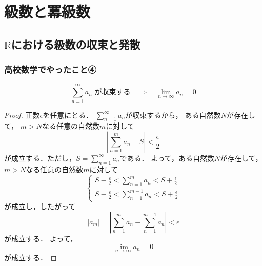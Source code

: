 \documentclass[./index]{subfiles}
\begin{document}
\section{級数と冪級数}

\subsection{$\mathbb{R}$における級数の収束と発散}
\subsubsection{高校数学でやったこと④}
\begin{screen}
    \begin{proposition}
        \begin{equation}
            \sum_{n = 1}^{\infty} a_n \mbox{ が収束する}
            \quad \Longrightarrow \quad
            \lim_{n \rightarrow \infty} a_n = 0
        \end{equation}
    \end{proposition}
\end{screen}

\begin{proof}
    正数$\epsilon$を任意にとる．
    $\sum_{n = 1}^{\infty} a_n$が収束するから，
    ある自然数$N$が存在して，
    $m > N$なる任意の自然数$m$に対して
    \begin{equation}
        \left| \sum_{n = 1}^{m} a_n - S \right| < \frac{\epsilon}{2}
    \end{equation}
    が成立する．ただし，$S = \sum_{n = 1}^{\infty} a_n$である．
    よって，ある自然数$N$が存在して，
    $m > N$なる任意の自然数$m$に対して
    \begin{equation}
        \begin{cases}
            \displaystyle S - \frac{\epsilon}{2} < \sum_{n = 1}^{m} a_n < S + \frac{\epsilon}{2} \\
            \displaystyle S - \frac{\epsilon}{2} < \sum_{n = 1}^{m - 1} a_n < S + \frac{\epsilon}{2}
        \end{cases}
    \end{equation}
    が成立し，したがって
    \begin{equation}
        |a_m| = \left| \sum_{n = 1}^{m} a_n - \sum_{n = 1}^{m - 1} a_n \right| < \epsilon
    \end{equation}
    が成立する．
    よって，
    \begin{equation}
        \lim_{n \rightarrow \infty} a_n = 0
    \end{equation}
    が成立する．
\end{proof}
\end{document}
